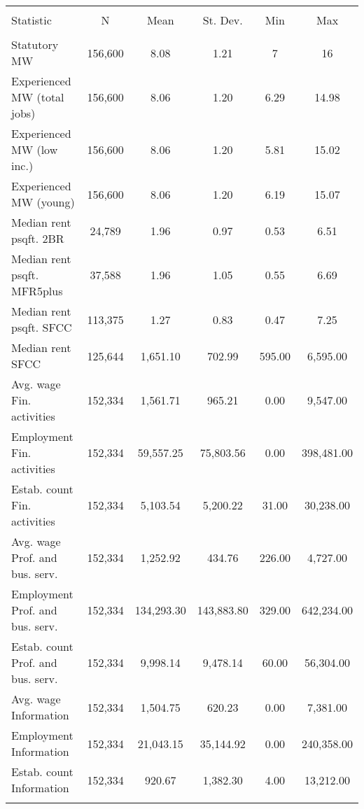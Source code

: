 
\begin{tabular}{@{\extracolsep{5pt}}lccccc} 
\\[-1.8ex]\hline 
\hline \\[-1.8ex] 
Statistic & \multicolumn{1}{c}{N} & \multicolumn{1}{c}{Mean} & \multicolumn{1}{c}{St. Dev.} & \multicolumn{1}{c}{Min} & \multicolumn{1}{c}{Max} \\ 
\hline \\[-1.8ex] 
Statutory MW & 156,600 & 8.08 & 1.21 & 7 & 16 \\ 
Experienced MW (total jobs) & 156,600 & 8.06 & 1.20 & 6.29 & 14.98 \\ 
Experienced MW (low inc.) & 156,600 & 8.06 & 1.20 & 5.81 & 15.02 \\ 
Experienced MW (young) & 156,600 & 8.06 & 1.20 & 6.19 & 15.07 \\ 
Median rent psqft. 2BR & 24,789 & 1.96 & 0.97 & 0.53 & 6.51 \\ 
Median rent psqft. MFR5plus & 37,588 & 1.96 & 1.05 & 0.55 & 6.69 \\ 
Median rent psqft. SFCC & 113,375 & 1.27 & 0.83 & 0.47 & 7.25 \\ 
Median rent SFCC & 125,644 & 1,651.10 & 702.99 & 595.00 & 6,595.00 \\ 
Avg. wage Fin. activities & 152,334 & 1,561.71 & 965.21 & 0.00 & 9,547.00 \\ 
Employment Fin. activities & 152,334 & 59,557.25 & 75,803.56 & 0.00 & 398,481.00 \\ 
Estab. count Fin. activities & 152,334 & 5,103.54 & 5,200.22 & 31.00 & 30,238.00 \\ 
Avg. wage Prof. and bus. serv. & 152,334 & 1,252.92 & 434.76 & 226.00 & 4,727.00 \\ 
Employment Prof. and bus. serv. & 152,334 & 134,293.30 & 143,883.80 & 329.00 & 642,234.00 \\ 
Estab. count Prof. and bus. serv. & 152,334 & 9,998.14 & 9,478.14 & 60.00 & 56,304.00 \\ 
Avg. wage Information & 152,334 & 1,504.75 & 620.23 & 0.00 & 7,381.00 \\ 
Employment Information & 152,334 & 21,043.15 & 35,144.92 & 0.00 & 240,358.00 \\ 
Estab. count Information & 152,334 & 920.67 & 1,382.30 & 4.00 & 13,212.00 \\ 
\hline \\[-1.8ex] 
\end{tabular} 
